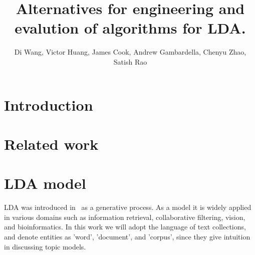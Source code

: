 \documentclass{sig-alternate}
\title{Alternatives for engineering and evalution of algorithms for LDA.}
\author{Di Wang,  Victor Huang, James Cook, Andrew Gambardella,  Chenyu Zhao, Satish Rao}
\date{}
\begin{document}
\maketitle

\begin{abstract}



\end{abstract}

\section{Introduction} \label{sec:intro}


\section{Related work}

\label{sec:related}

%
\section{LDA model} \label{sec:ldamodel}
LDA was introduced in~\cite{Blei2003a} as a generative process. As a
model it is widely applied in various domains such as information
retrieval, collaborative filtering, vision, and bioinformatics. In
this work we will adopt the language of text collections, and denote
entities as 'word', 'document', and 'corpus', since they give
intuition in discussing topic models.
\end{document}
